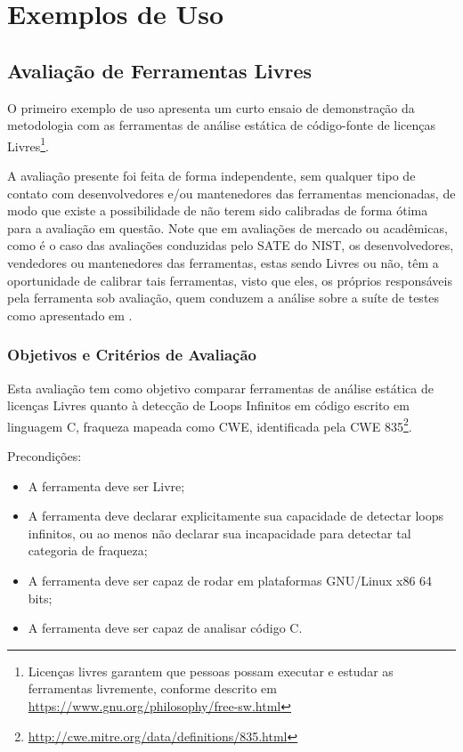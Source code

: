 \chapter{Exemplos de Uso}\label{exemplos_de_uso}

\section{Avaliação de Ferramentas Livres}

O primeiro exemplo de uso apresenta um curto ensaio de demonstração da metodologia com as ferramentas de análise estática de código-fonte de licenças Livres\footnote{Licenças livres garantem que pessoas possam executar e estudar as ferramentas livremente, conforme descrito em \url{https://www.gnu.org/philosophy/free-sw.html}}. 

A avaliação presente foi feita de forma independente, sem qualquer tipo de contato com desenvolvedores e/ou mantenedores das ferramentas mencionadas, de modo que existe a possibilidade de não terem sido calibradas de forma ótima para a avaliação em questão. Note que em avaliações de mercado ou acadêmicas, como é o caso das avaliações conduzidas pelo SATE do NIST, os desenvolvedores, vendedores ou mantenedores das ferramentas, estas sendo Livres ou não, têm a oportunidade de calibrar tais ferramentas, visto que eles, os próprios responsáveis pela ferramenta sob avaliação, quem conduzem a análise sobre a suíte de testes como apresentado em \cite{sate_iv}.

\subsection{Objetivos e Critérios de Avaliação}

Esta avaliação tem como objetivo comparar ferramentas de análise estática de licenças Livres quanto à detecção de Loops Infinitos em código escrito em linguagem C, fraqueza mapeada como CWE, identificada pela CWE 835\footnote{\url{http://cwe.mitre.org/data/definitions/835.html}}.

Precondições:
\begin{itemize}
  \item A ferramenta deve ser Livre;
  \item A ferramenta deve declarar explicitamente sua capacidade de detectar loops infinitos, ou ao menos não declarar sua incapacidade para detectar tal categoria de fraqueza;
  \item A ferramenta deve ser capaz de rodar em plataformas GNU/Linux x86 64 bits;
  \item A ferramenta deve ser capaz de analisar código C.
\end{itemize}


